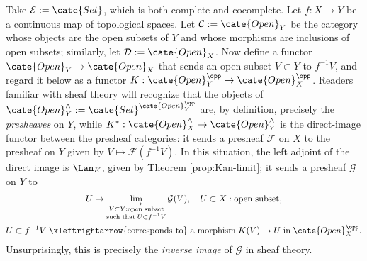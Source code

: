 \begin{example}
	Take $\mathcal{E}:=\cate{Set}$, which is both complete and cocomplete. Let
	$f:X\to Y$ be a continuous map of topological spaces. Let
	$\mathcal{C}:=\cate{Open}_Y$ be the category whose objects are the open
	subsets of $Y$ and whose morphisms are inclusions of open subsets; similarly,
	let $\mathcal{D}:=\cate{Open}_X$. Now define a functor
	$\cate{Open}_Y\to\cate{Open}_X$ that sends an open subset $V\subset Y$ to
	$f^{-1}V$, and regard it below as a functor
	$K:\cate{Open}_Y^{\opp}\to\cate{Open}_X^{\opp}$. Readers familiar with
	sheaf theory will recognize that the objects of
	$\cate{Open}_Y^\wedge:=\cate{Set}^{\cate{Open}_Y^{\opp}}$ are, by
	definition, precisely the \emph{presheaves} on $Y$, while
	$K^*:\cate{Open}_X^\wedge\to\cate{Open}_Y^\wedge$ is the direct-image
	functor between the presheaf categories: it sends a presheaf $\mathcal{F}$
	on $X$ to the presheaf on $Y$ given by
	$V\mapsto\mathcal{F}(f^{-1}V)$. In this situation, the left adjoint of the
	direct image is $\Lan_K$, given by Theorem \ref{prop:Kan-limit}; it sends a
	presheaf $\mathcal{G}$ on $Y$ to
	\begin{gather*}
		U \mapsto \varinjlim_{\substack{V \subset Y: \text{open subset} \\ \text{such that}\; U \subset f^{-1} V }} \mathcal{G}(V), \quad U \subset X: \text{open subset}, \\
		U \subset f^{-1}V \;\xleftrightarrow{\text{corresponds to}}\; \text{a morphism}\; K(V) \to U \;\text{in}\; \cate{Open}_X^{\opp}.
	\end{gather*}
	Unsurprisingly, this is precisely the \emph{inverse image} of $\mathcal{G}$
	in sheaf theory.
\end{example}
